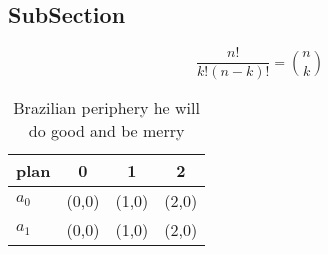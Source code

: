 \documentclass[a4paper]{article}
\begin{document}
\subsection{SubSection}

\[ \frac{n!}{k!(n-k)!} = \binom{n}{k} \]

\begin{table}
\begin{adjustbox}{width=0.6\columnwidth}
\begin{tabular}{|l|l|l|l|}
\hline
\textbf{plan} & \multicolumn{1}{c|}{\textbf{0}} & \multicolumn{1}{c|}{\textbf{1}} & \multicolumn{1}{c|}{\textbf{2}} \\ \hline
\textbf{$a_0$}  & (0,0) & (1,0) & (2,0) \\ \hline
\textbf{$a_1$}  & (0,0) & (1,0) & (2,0) \\ \hline
\end{tabular}
\end{adjustbox}
\caption{Brazilian periphery he will do good and be merry 
}
\end{table}
\end{document}
